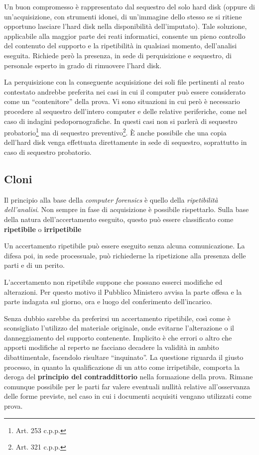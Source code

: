 Un buon compromesso è rappresentato dal sequestro del solo hard disk (oppure di un'acquisizione, con strumenti idonei, di un'immagine dello stesso se si ritiene opportuno lasciare l'hard disk nella disponibilità dell'imputato).
Tale soluzione, applicabile alla maggior parte dei reati informatici, consente un pieno controllo del contenuto del supporto e la ripetibilità in qualsiasi momento, dell'analisi eseguita. Richiede però la presenza, in sede di perquisizione e sequestro, di personale esperto in grado di rimuovere l'hard disk.

La perquisizione con la conseguente acquisizione dei soli file pertinenti al reato contestato andrebbe preferita nei casi in cui il computer può essere considerato come un ``contenitore'' della prova. Vi sono situazioni in cui però è necessario procedere al sequestro dell'intero computer e delle relative periferiche, come nel caso di indagini pedopornografiche. In questi casi non si parlerà di sequestro probatorio\footnote{Art. 253 c.p.p.} ma di sequestro preventivo\footnote{Art. 321 c.p.p.}. \`E anche possibile che una copia dell'hard disk venga effettuata direttamente in sede di sequestro, soprattutto in caso di sequestro probatorio. 
 
\subsection{Cloni}

Il principio alla base della \textit{computer forensics} è quello della \textit{ripetibilità dell'analisi}. Non sempre in fase di acquisizione è possibile rispettarlo. Sulla base della natura dell'accertamento eseguito, questo può essere classificato come \textbf{ripetibile} o \textbf{irripetibile} 

Un accertamento ripetibile può essere eseguito senza alcuna comunicazione. La difesa poi, in sede processuale, può richiederne la ripetizione alla presenza delle parti e di un perito. 

L'accertamento non ripetibile suppone che possano esserci modifiche ed alterazioni. Per questo motivo il Pubblico Ministero avvisa la parte offesa e la parte indagata sul giorno, ora e luogo del conferimento dell'incarico.

Senza dubbio sarebbe da preferirsi un accertamento ripetibile, così come è sconsigliato l'utilizzo del materiale originale, onde evitarne l'alterazione o il danneggiamento del supporto contenente. 
Implicito è che errori o altro che apporti modifiche al reperto ne facciano decadere la validità in ambito dibattimentale, facendolo risultare ``inquinato''. La questione riguarda il giusto processo, in quanto la qualificazione di un atto come irripetibile, comporta la deroga del \textbf{principio del contraddittorio} nella formazione della prova. Rimane comunque possibile per le parti far valere eventuali nullità relative all'osservanza delle forme previste, nel caso in cui i documenti acquisiti vengano utilizzati come prova.


